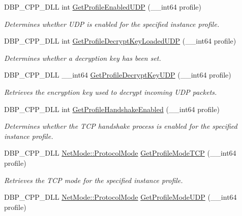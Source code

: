 \begin{DoxyCompactItemize}
DBP\_\-CPP\_\-DLL int \hyperlink{namespacemn_a395289f6266e2ee08091c3099b235302}{GetProfileEnabledUDP} (\_\-\_\-int64 profile)
\begin{DoxyCompactList}\small\item\em Determines whether UDP is enabled for the specified instance profile. \item\end{DoxyCompactList}\item 
DBP\_\-CPP\_\-DLL int \hyperlink{namespacemn_afd73e16d7b1f93fe61ea1779350aca18}{GetProfileDecryptKeyLoadedUDP} (\_\-\_\-int64 profile)
\begin{DoxyCompactList}\small\item\em Determines whether a decryption key has been set. \item\end{DoxyCompactList}\item 
DBP\_\-CPP\_\-DLL \_\-\_\-int64 \hyperlink{namespacemn_a479f9bfb83337581115f69cac70ba8bd}{GetProfileDecryptKeyUDP} (\_\-\_\-int64 profile)
\begin{DoxyCompactList}\small\item\em Retrieves the encryption key used to decrypt incoming UDP packets. \item\end{DoxyCompactList}\item 
DBP\_\-CPP\_\-DLL int \hyperlink{namespacemn_a4c8fbfebb44500e7957b551adec86059}{GetProfileHandshakeEnabled} (\_\-\_\-int64 profile)
\begin{DoxyCompactList}\small\item\em Determines whether the TCP handshake process is enabled for the specified instance profile. \item\end{DoxyCompactList}\item 
DBP\_\-CPP\_\-DLL \hyperlink{class_net_mode_a43cfa55ee6a4db66a8d7d6c27f766964}{NetMode::ProtocolMode} \hyperlink{namespacemn_a9b7066e85fc1d4c14209a60e2c86bb13}{GetProfileModeTCP} (\_\-\_\-int64 profile)
\begin{DoxyCompactList}\small\item\em Retrieves the TCP mode for the specified instance profile. \item\end{DoxyCompactList}\item 
DBP\_\-CPP\_\-DLL \hyperlink{class_net_mode_a43cfa55ee6a4db66a8d7d6c27f766964}{NetMode::ProtocolMode} \hyperlink{namespacemn_adc65c37445c956f898dd99bf12ed83a4}{GetProfileModeUDP} (\_\-\_\-int64 profile)

\end{DoxyCompactItemize}
